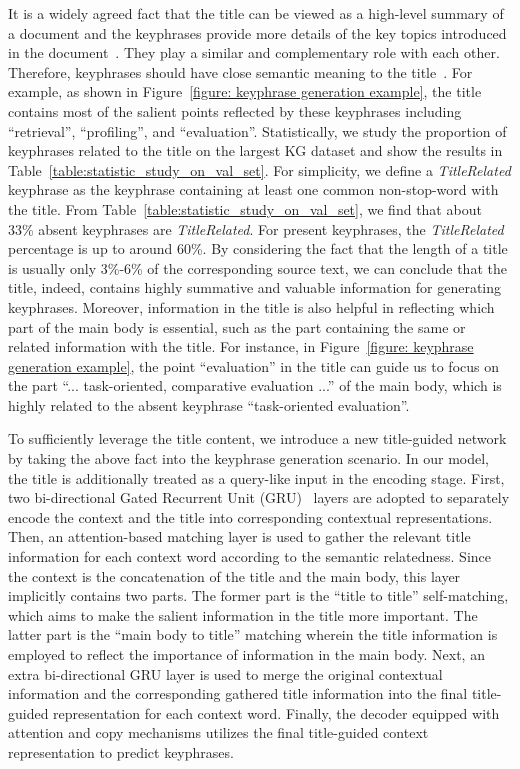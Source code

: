 \documentclass[letterpaper]{article} %
\begin{document}
It is a widely agreed fact that the title can be viewed as a high-level summary of a document and the keyphrases provide more details of the key topics introduced in the document~\cite{li2010semi_title}. They play a similar and complementary role with each other. Therefore, keyphrases should have close semantic meaning to the title~\cite{li2010semi_title}. For example, as shown in Figure~\ref{figure: keyphrase generation example}, the title contains most of the salient points reflected by these keyphrases including ``retrieval'', ``profiling'', and ``evaluation''. Statistically, we study the proportion of keyphrases related to the title on the largest KG dataset and show the results in Table~\ref{table:statistic_study_on_val_set}. For simplicity, we define a \textit{TitleRelated} keyphrase as the keyphrase containing at least one common non-stop-word with the title. From Table~\ref{table:statistic_study_on_val_set}, we find that about 33\% absent keyphrases are \textit{TitleRelated}. For present keyphrases, the \textit{TitleRelated} percentage is up to around 60\%. By considering the fact that the length of a title is usually only 3\%-6\% of the corresponding source text, we can conclude that the title, indeed, contains highly summative and valuable information for generating keyphrases. 
Moreover, information in the title is also helpful in reflecting which part of the main body is essential, such as the part containing the same or related information with the title. For instance, in Figure~\ref{figure: keyphrase generation example}, the point ``evaluation'' in the title can guide us to focus on the part ``... task-oriented, comparative evaluation ...'' of the main body, which is highly related to the absent keyphrase ``task-oriented evaluation''.


To sufficiently leverage the title content, we introduce a new title-guided network by taking the above fact into the keyphrase generation scenario. In our model, the title is additionally treated as a query-like input in the encoding stage. First, two bi-directional Gated Recurrent Unit (GRU)~\cite{cho2014learning} layers are adopted to separately encode the context and the title into corresponding contextual representations. Then, an attention-based matching layer is used to gather the relevant title information for each context word according to the semantic relatedness. Since the context is the concatenation of the title and the main body, this layer implicitly contains two parts. The former part is the ``title to title'' self-matching, which aims to make the salient information in the title more important. The latter part is the ``main body to title'' matching wherein the title information is employed to reflect the importance of information in the main body. Next, an extra bi-directional GRU layer is used to merge the original contextual information and the corresponding gathered title information into the final title-guided representation for each context word. Finally, the decoder equipped with attention and copy mechanisms utilizes the final title-guided context representation to predict keyphrases. 
\end{document}
